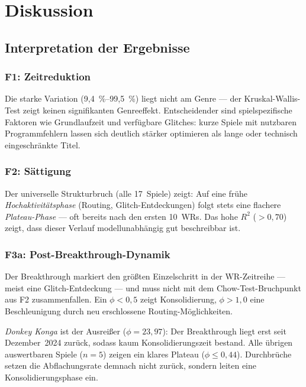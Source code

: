 \chapter{Diskussion}
\label{chap:diskussion}

\section{Interpretation der Ergebnisse}

\subsection*{F1: Zeitreduktion}

Die starke Variation (9,4~\%–99,5~\%) liegt nicht am Genre --- der Kruskal-Wallis-Test zeigt keinen signifikanten Genreeffekt. Entscheidender sind spielspezifische Faktoren wie Grundlaufzeit und verfügbare Glitches: kurze Spiele mit nutzbaren Programmfehlern lassen sich deutlich stärker optimieren als lange oder technisch eingeschränkte Titel.

\subsection*{F2: Sättigung}

Der universelle Strukturbruch (alle 17~Spiele) zeigt: Auf eine frühe \emph{Hochaktivitätsphase} (Routing, Glitch-Entdeckungen) folgt stets eine flachere \emph{Plateau-Phase} --- oft bereits nach den ersten 10~WRs. Das hohe $R^2$ ($> 0{,}70$) zeigt, dass dieser Verlauf modellunabhängig gut beschreibbar ist.

\subsection*{F3a: Post-Breakthrough-Dynamik}

Der Breakthrough markiert den größten Einzelschritt in der WR-Zeitreihe --- meist eine Glitch-Entdeckung --- und muss nicht mit dem Chow-Test-Bruchpunkt aus F2 zusammenfallen. Ein $\phi < 0{,}5$ zeigt Konsolidierung, $\phi > 1{,}0$ eine Beschleunigung durch neu erschlossene Routing-Möglichkeiten.

\textit{Donkey Konga} ist der Ausreißer ($\phi = 23{,}97$): Der Breakthrough liegt erst seit Dezember~2024 zurück, sodass kaum Konsolidierungszeit bestand. Alle übrigen auswertbaren Spiele ($n = 5$) zeigen ein klares Plateau ($\phi \leq 0{,}44$). Durchbrüche setzen die Abflachungsrate demnach nicht zurück, sondern leiten eine Konsolidierungsphase ein.

